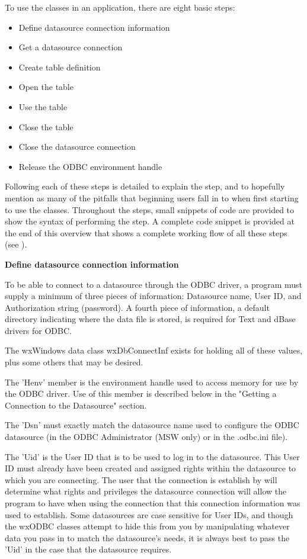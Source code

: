 To use the classes in an application, there are eight basic steps:

\begin{itemize}\itemsep=0pt
\item Define datasource connection information
\item Get a datasource connection
\item Create table definition
\item Open the table
\item Use the table
\item Close the table
\item Close the datasource connection
\item Release the ODBC environment handle
\end{itemize}

Following each of these steps is detailed to explain the step, and to 
hopefully mention as many of the pitfalls that beginning users fall in 
to when first starting to use the classes. Throughout the steps, small 
snippets of code are provided to show the syntax of performing the step. A 
complete code snippet is provided at the end of this overview that shows a 
complete working flow of all these steps (see 
).

{\bf Define datasource connection information}

To be able to connect to a datasource through the ODBC driver, a program must 
supply a minimum of three pieces of information: Datasource name, User ID, and 
Authorization string (password). A fourth piece of information, a default 
directory indicating where the data file is stored, is required for Text and 
dBase drivers for ODBC.

The wxWindows data class wxDbConnectInf exists for holding all of these 
values, plus some others that may be desired.

The 'Henv' member is the environment handle used to access memory for use by the 
ODBC driver. Use of this member is described below in the "Getting a Connection 
to the Datasource" section.

The 'Dsn' must exactly match the datasource name used to configure the ODBC 
datasource (in the ODBC Administrator (MSW only) or in the .odbc.ini file).

The 'Uid' is the User ID that is to be used to log in to the datasource. This 
User ID must already have been created and assigned rights within the 
datasource to which you are connecting. The user that the connection is 
establish by will determine what rights and privileges the datasource 
connection will allow the program to have when using the connection that 
this connection information was used to establish. Some datasources are 
case sensitive for User IDs, and though the wxODBC classes attempt to hide 
this from you by manipulating whatever data you pass in to match the 
datasource's needs, it is always best to pass the 'Uid' in the case that 
the datasource requires.

